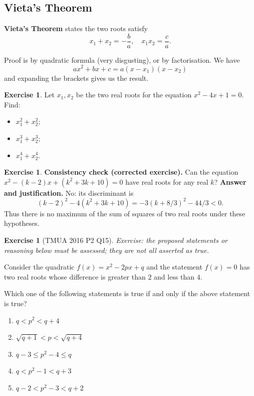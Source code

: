 \documentclass[11pt]{article}
\theoremstyle{definition}
\newtheorem{example}[theorem]{Exercise}
\theoremstyle{remark}
\newcommand{\pqty}[1]{\left(#1\right)}
\begin{document}
\subsection{Vieta's Theorem}\label{tmua-1-subsection-005}
\textbf{Vieta's Theorem} states the two roots satisfy
\[
    x_1 + x_2 = - \frac{b}{a}, \quad x_1 x_2 = \frac{c}{a}.
\]

Proof is by quadratic formula (very disgusting), or by factorisation. We have
\[
    a x^2 + bx + c = a \pqty{x - x_1} \pqty{x - x_2}
\]
and expanding the brackets gives us the result.

\begin{example}\label{tmua-1-unit-017}
    Let \(x_1, x_2\) be the two real roots for the equation \(x^2 - 4x + 1 = 0\). Find:
    \begin{itemize}
        \item \(x_1^2 + x_2^2\);
        \item \(x_1^3 + x_2^3\);
        \item \(x_1^4 + x_2^4\).
    \end{itemize}
\end{example}

\begin{example}\label{tmua-1-unit-018}
    \textbf{Consistency check (corrected exercise).} Can the equation
\(x^2-(k-2)x+(k^2+3k+10)=0\) have real roots for any real \(k\)?
\textbf{Answer and justification.} No: its discriminant is
\[
(k-2)^2-4(k^2+3k+10)=-3(k+8/3)^2-44/3<0.
\]
Thus there is no maximum of the sum of squares of two real roots under these hypotheses.
\end{example}

\begin{example}[TMUA 2016 P2 Q15]\label{tmua-1-unit-019}
\textit{Exercise: the proposed statements or reasoning below must be assessed; they are not all asserted as true.}\par

    Consider the quadratic \(f\pqty{x} = x^2 - 2px + q\) and the statement \(f\pqty{x} = 0\) has two real roots whose difference is greater than \(2\) and less than \(4\).

    Which one of the following statements is true if and only if the above statement is true?

    \begin{enumerate}
        \item \(q < p^2 < q + 4\)
        \item \(\sqrt{q + 1} < p < \sqrt{q + 4}\)
        \item \(q - 3 \leq p^2 - 4 \leq q\)
        \item \(q < p^2 - 1 < q + 3\)
        \item \(q - 2 < p^2 - 3 < q + 2\)
    \end{enumerate}
\end{example}
\end{document}
